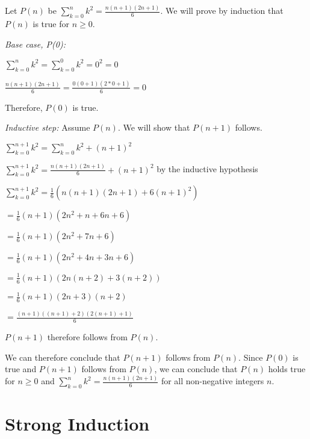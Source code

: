 \documentclass[solution, letterpaper]{cs20}
\begin{document}
        \begin{solution}

        Let $P(n)$ be $\sum_{k=0}^{n}k^{2}=\frac{n(n+1)(2n+1)}{6}$. We will prove by induction that $P(n)$ is true for $n\geq0$.

        \textit{Base case, P(0):}

        $\sum_{k=0}^{n}k^{2}=\sum_{k=0}^{0}k^{2}= 0^2 = 0$

        $\frac{n(n+1)(2n+1)}{6}=\frac{0(0+1)(2*0+1)}{6}=0$

        Therefore, $P(0)$ is true.

        \textit{Inductive step:} Assume $P(n)$. We will show that $P(n+1)$ follows.

        $\sum_{k=0}^{n+1}k^{2} = \sum_{k=0}^{n}k^{2} + (n+1)^2$

        $\sum_{k=0}^{n+1}k^{2} = \frac{n(n+1)(2n+1)}{6} + (n+1)^2$ by the inductive hypothesis

        $\sum_{k=0}^{n+1}k^{2} = \frac{1}{6} (n(n+1)(2n+1) + 6(n+1)^2)$

        \hspace{1.6cm}$ = \frac{1}{6} (n+1)(2n^2+n+6n+6)$

        \hspace{1.6cm}$ = \frac{1}{6} (n+1)(2n^2+7n+6)$

        \hspace{1.6cm}$ = \frac{1}{6} (n+1)(2n^2+4n+3n+6)$

        \hspace{1.6cm}$ = \frac{1}{6} (n+1)(2n(n+2)+3(n+2))$

        \hspace{1.6cm}$ = \frac{1}{6} (n+1)(2n+3)(n+2)$

        \hspace{1.6cm}$ = \frac{(n+1)((n+1)+2)(2(n+1)+1)}{6}$

        $P(n+1)$ therefore follows from $P(n)$.

        We can therefore conclude that $P(n+1)$ follows from $P(n)$. Since $P(0)$ is true and $P(n+1)$ follows from $P(n)$, we can conclude that $P(n)$ holds true for $n \geq 0$ and $\sum_{k=0}^{n}k^{2}=\frac{n(n+1)(2n+1)}{6}$ for all non-negative integers $n$.

        \end{solution}


	\section{Strong Induction}
\end{document}
